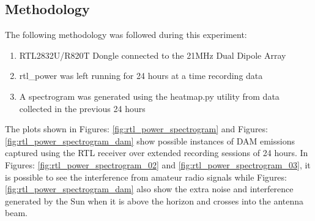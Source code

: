 \documentclass[runningheads,a4paper]{llncs}
\begin{document}
\subsection*{Methodology}
The following methodology was followed during this experiment:

\begin{enumerate}
	\item RTL2832U/R820T Dongle connected to the 21MHz Dual Dipole Array
	\item rtl\_power was left running for 24 hours at a time recording data
	\item A spectrogram was generated using the heatmap.py utility from data collected in the previous 24 hours
\end{enumerate}

The plots shown in Figures: \ref{fig:rtl_power_spectrogram} and Figures: \ref{fig:rtl_power_spectrogram_dam} show possible instances of \gls{DAM} emissions captured using the RTL receiver over extended recording sessions of 24 hours. In Figures: \ref{fig:rtl_power_spectrogram_02} and  \ref{fig:rtl_power_spectrogram_03}, it is possible to see the interference from amateur radio signals while Figures: \ref{fig:rtl_power_spectrogram_dam} also show the extra noise and interference generated by the Sun when it is above the horizon and crosses into the antenna beam.
\end{document}
